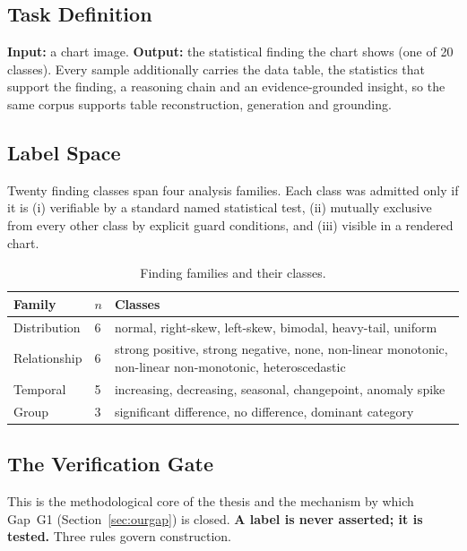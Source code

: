\subsection{Task Definition}

\textbf{Input:} a chart image. \textbf{Output:} the statistical finding the chart
shows (one of 20 classes). Every sample additionally carries the data table, the
statistics that support the finding, a reasoning chain and an evidence-grounded
insight, so the same corpus supports table reconstruction, generation and grounding.

\subsection{Label Space}

Twenty finding classes span four analysis families. Each class was admitted only
if it is (i) verifiable by a standard named statistical test, (ii) mutually
exclusive from every other class by explicit guard conditions, and (iii) visible
in a rendered chart.

\begin{table}[h]\centering\small
\caption{Finding families and their classes.}
\label{tab:families}
\begin{tabular}{llp{7.1cm}}
\toprule
\textbf{Family} & \textbf{$n$} & \textbf{Classes} \\
\midrule
Distribution & 6 & normal, right-skew, left-skew, bimodal, heavy-tail, uniform \\
Relationship & 6 & strong positive, strong negative, none, non-linear monotonic,
                  non-linear non-monotonic, heteroscedastic \\
Temporal & 5 & increasing, decreasing, seasonal, changepoint, anomaly spike \\
Group & 3 & significant difference, no difference, dominant category \\
\bottomrule
\end{tabular}
\end{table}

\subsection{The Verification Gate}
\label{sec:gate}

This is the methodological core of the thesis and the mechanism by which
Gap~G1 (Section~\ref{sec:ourgap}) is closed. \textbf{A label is never asserted;
it is tested.} Three rules govern construction.

